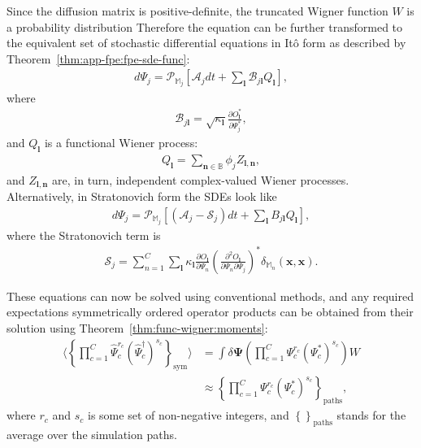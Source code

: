 \documentclass[12pt,aip,jmp,amssymb,amsmath]{revtex4-1}
\begin{document}
Since the diffusion matrix is positive-definite, the truncated Wigner function $W$ is a probability distribution
Therefore the equation can be further transformed to the equivalent set of stochastic differential equations in It\^{o} form as described by Theorem~\ref{thm:app-fpe:fpe-sde-func}:
\begin{eqnarray}\label{eqn:fpe:sdes}
    d\Psi_j = \mathcal{P}_{\mathbb{M}_j} \left[
        \mathcal{A}_j dt + \sum_{\boldsymbol{l}} \mathcal{B}_{j \boldsymbol{l}} Q_{\boldsymbol{l}}
    \right],
\end{eqnarray}
where
\begin{eqnarray}
    \mathcal{B}_{j \boldsymbol{l}} = \sqrt{\kappa_{\boldsymbol{l}}} \frac{\partial O_{\boldsymbol{l}}^*}{\partial \Psi_j^*},
\end{eqnarray}
and $Q_{\boldsymbol{l}}$ is a functional Wiener process:
\begin{eqnarray}
    Q_{\boldsymbol{l}} = \sum_{\boldsymbol{n} \in \mathbb{B}} \phi_j Z_{\boldsymbol{l},\boldsymbol{n}},
\end{eqnarray}
and $Z_{\boldsymbol{l},\boldsymbol{n}}$ are, in turn, independent complex-valued Wiener processes.
Alternatively, in Stratonovich form the SDEs look like
\begin{eqnarray}
    d\Psi_j = \mathcal{P}_{\mathbb{M}_j} \left[
        (\mathcal{A}_j - \mathcal{S}_j) dt + \sum_{\boldsymbol{l}} B_{j \boldsymbol{l}} Q_{\boldsymbol{l}}
    \right],
\end{eqnarray}
where the Stratonovich term is
\begin{eqnarray}
    \mathcal{S}_j
    = \sum_{n=1}^C \sum_{\boldsymbol{l}} \kappa_{\boldsymbol{l}}
        \frac{\partial O_{\boldsymbol{l}}}{\partial \Psi_n}
        \left(\frac{\partial^2 O_{\boldsymbol{l}}}{\partial \Psi_n \partial \Psi_j} \right)^*
        \delta_{\mathbb{M}_n} (\boldsymbol{x}, \boldsymbol{x}).
\end{eqnarray}

These equations can now be solved using conventional methods, and any required expectations symmetrically ordered operator products can be obtained from their solution using Theorem~\ref{thm:func-wigner:moments}:
\begin{eqnarray}
    \langle \left\{
        \prod_{c=1}^C \hat{\Psi}_c^{r_c} (\hat{\Psi}_c^\dagger)^{s_c}
    \right\}_{\mathrm{sym}} \rangle
    & = \int \delta \boldsymbol{\Psi} \left(
            \prod_{c=1}^C \Psi_c^{r_c} (\Psi_c^*)^{s_c}
        \right) W \\
    & \approx \left\{
        \prod_{c=1}^C \Psi_c^{r_c} (\Psi_c^*)^{s_c}
    \right\}_{\mathrm{paths}},
\end{eqnarray}
where $r_c$ and $s_c$ is some set of non-negative integers, and $\left\{\right\}_{\mathrm{paths}}$ stands for the average over the simulation paths.
\end{document}
